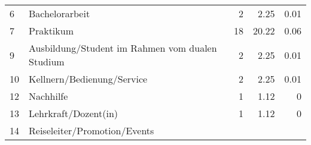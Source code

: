 \begin{longtable}{lXrrr}
     6 &
     \multicolumn{1}{X}{ Bachelorarbeit   } &


       \num{2} &
       \num[round-mode=places,round-precision=2]{2.25} &
         \num[round-mode=places,round-precision=2]{0.01} \\

     7 &
     \multicolumn{1}{X}{ Praktikum   } &


       \num{18} &
       \num[round-mode=places,round-precision=2]{20.22} &
         \num[round-mode=places,round-precision=2]{0.06} \\

     9 &
     \multicolumn{1}{X}{ Ausbildung/Student im Rahmen vom dualen Studium   } &


       \num{2} &
       \num[round-mode=places,round-precision=2]{2.25} &
         \num[round-mode=places,round-precision=2]{0.01} \\

     10 &
     \multicolumn{1}{X}{ Kellnern/Bedienung/Service   } &


       \num{2} &
       \num[round-mode=places,round-precision=2]{2.25} &
         \num[round-mode=places,round-precision=2]{0.01} \\

     12 &
     \multicolumn{1}{X}{ Nachhilfe   } &


       \num{1} &
       \num[round-mode=places,round-precision=2]{1.12} &
         \num[round-mode=places,round-precision=2]{0} \\

     13 &
     \multicolumn{1}{X}{ Lehrkraft/Dozent(in)   } &


       \num{1} &
       \num[round-mode=places,round-precision=2]{1.12} &
         \num[round-mode=places,round-precision=2]{0} \\

     14 &
     \multicolumn{1}{X}{ Reiseleiter/Promotion/Events   } &



\end{longtable}
